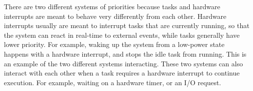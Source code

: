 There are two different systems of priorities because tasks and hardware
interrupts are meant to behave very differently from each other. Hardware
interrupts usually are meant to interrupt tasks that are currently running, so
that the system can react in real-time to external events, while tasks generally
have lower priority. For example, waking up the system from a low-power state
happens with a hardware interrupt, and stops the idle task from running. This is
an example of the two different systems interacting. These
two systems can also interact with each other when a task requires a hardware
interrupt to continue execution. For example, waiting on a hardware timer, or an
I/O request.
